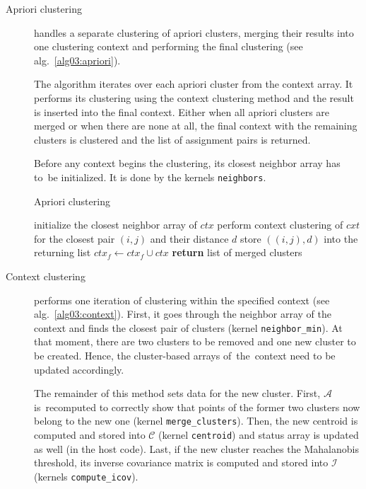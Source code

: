\begin{description}
	\item[Apriori clustering] handles a separate clustering of apriori clusters, merging their results into one clustering context and performing the final clustering (see alg.~\ref{alg03:apriori}).
	
	The algorithm iterates over each apriori cluster from the context array. It performs its clustering using the context clustering method and the result is inserted into the final context. Either when all apriori clusters are merged or when there are none at all, the final context with the remaining clusters is clustered and the list of assignment pairs is returned.
	
	Before any context begins the clustering, its closest neighbor array has to~be initialized. It is done by the kernels \texttt{neighbors}.
	
	
	\begin{algorithm}
		\caption{Apriori clustering}
		\label{alg03:apriori}
		\begin{algorithmic}[1]
			 
			\State initialize the closest neighbor array of $ctx$ 
			\State perform context clustering of $cxt$ for the closest pair $(i,j)$ and their distance $d$
			\State store $((i,j),d)$ into the returning list
			\EndWhile
			\State $ctx_f \gets ctx_f \cup ctx$ 
			\EndFor
			\State \textbf{return} list of merged clusters
			\EndProcedure
		\end{algorithmic}
	\end{algorithm}

	\item[Context clustering] performs one iteration of clustering within the specified context (see alg.~\ref{alg03:context}). First, it goes through the neighbor array of the context and finds the closest pair of clusters (kernel \texttt{neighbor\_min}). At that moment, there are two clusters to be removed and one new cluster to be created. Hence, the cluster-based arrays of~the~context need to be updated accordingly.
	
	The remainder of this method sets data for the new cluster. First, $\mathcal{A}$ is~recomputed to correctly show that points of the former two clusters now belong to the new one (kernel \texttt{merge\_clusters}). Then, the new centroid is computed and stored into $\mathcal{C}$ (kernel \texttt{centroid}) and status array is updated as well (in the host code). Last, if the new cluster reaches the Mahalanobis threshold, its inverse covariance matrix is computed and stored into $\mathcal{I}$ (kernels \texttt{compute\_icov}). 
	

\end{description}
